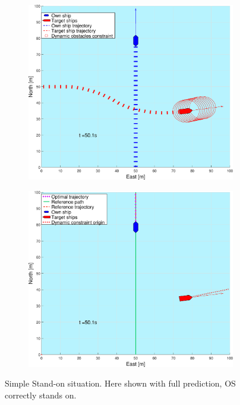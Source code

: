 \begin{figure}[ht!]
\begin{subfigure}[b]{0.499\textwidth}
        \subcaption{}
    \end{subfigure}
    \hfill
    \\
    \begin{subfigure}[b]{0.49\textwidth}
        \centering
        \includegraphics[width=\textwidth]{Images/Figures/enkel_SO/_Simple_0fig1_time=50}
        \subcaption{}
    \end{subfigure}
    \hfill
    \begin{subfigure}[b]{0.499\textwidth}
        \centering
        \includegraphics[width=\textwidth]{Images/Figures/enkel_SO/_Simple_0fig999_time=50}
        \subcaption{}
    \end{subfigure}
    \hfill
    \caption{Simple Stand-on situation. Here shown with full prediction, \gls{OS} correctly stands on.}
    \label{FIG: simple SO full pred}
\end{figure}%
